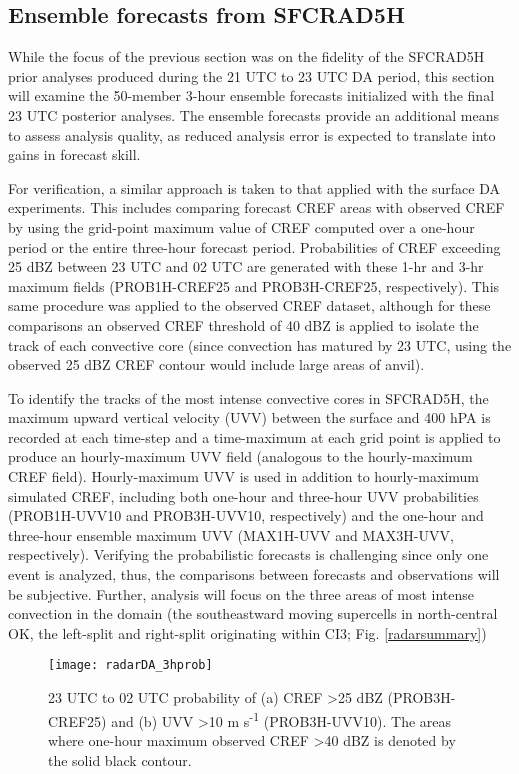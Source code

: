 \subsection{Ensemble forecasts from SFCRAD5H}
While the focus of the previous section was on the fidelity of the SFCRAD5H prior analyses produced during the 21 UTC to 23 UTC DA period, this section will examine the 50-member 3-hour ensemble forecasts initialized with the final 23 UTC posterior analyses. The ensemble forecasts provide an additional means to assess analysis quality, as reduced analysis error is expected to translate into gains in forecast skill.

For verification, a similar approach is taken to that applied with the surface DA experiments. This includes comparing forecast CREF areas with observed CREF by using the grid-point maximum value of CREF computed over a one-hour period or the entire three-hour forecast period. Probabilities of CREF exceeding 25 dBZ between 23 UTC and 02 UTC are generated with these 1-hr and 3-hr maximum fields (PROB1H-CREF25 and PROB3H-CREF25, respectively). This same procedure was applied to the observed CREF dataset, although for these comparisons an observed CREF threshold of 40 dBZ is applied to isolate the track of each convective core (since convection has matured by 23 UTC, using the observed 25 dBZ CREF contour would include large areas of anvil).

To identify the tracks of the most intense convective cores in SFCRAD5H, the maximum upward vertical velocity (UVV) between the surface and 400 hPA is recorded at each time-step and a time-maximum at each grid point is applied to produce an hourly-maximum UVV field (analogous to the hourly-maximum CREF field). Hourly-maximum UVV is used in addition to hourly-maximum simulated CREF, including both one-hour and three-hour UVV probabilities (PROB1H-UVV10 and PROB3H-UVV10, respectively) and the one-hour and three-hour ensemble maximum UVV (MAX1H-UVV and MAX3H-UVV, respectively). Verifying the probabilistic forecasts is challenging since  only one event is analyzed, thus, the comparisons between forecasts and observations will be subjective. Further, analysis will  focus on the three areas of most intense convection in the domain (the southeastward moving supercells in north-central OK, the left-split and right-split originating within CI3; Fig. \ref{radarsummary})

\begin{figure}
\centering
\texttt{[image: radarDA\_3hprob]}
\OUsinglespace
\caption{23 UTC to 02 UTC probability of (a) CREF \textgreater 25 dBZ (PROB3H-CREF25) and (b) UVV \textgreater 10 m s\textsuperscript{-1} (PROB3H-UVV10). The areas where one-hour maximum observed CREF \textgreater 40 dBZ is denoted by the solid black contour.}
\label{3hrprob}
\end{figure}

